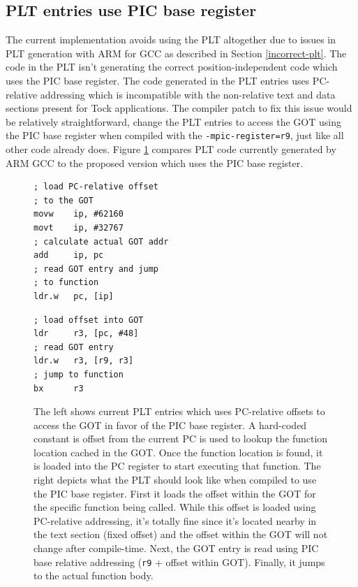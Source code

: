 \documentclass[12pt]{ucsddissertation}
\begin{document}
\subsection{PLT entries use PIC base register}

The current implementation avoids using the PLT altogether due to issues in PLT generation with ARM for GCC as described in Section \ref{incorrect-plt}. The code in the PLT isn't generating the correct position-independent code which uses the PIC base register. The code generated in the PLT entries uses PC-relative addressing which is incompatible with the non-relative text and data sections present for Tock applications. The compiler patch to fix this issue would be relatively straightforward, change the PLT entries to access the GOT using the PIC base register when compiled with the \texttt{-mpic-register=r9}, just like all other code already does. Figure \ref{fig:plt-fix} compares PLT code currently generated by ARM GCC to the proposed version which uses the PIC base register.

\begin{figure}[h!]
    \begin{minipage}{0.45\textwidth}
    \begin{verbatim}
; load PC-relative offset 
; to the GOT
movw    ip, #62160
movt    ip, #32767
; calculate actual GOT addr 
add     ip, pc
; read GOT entry and jump
; to function
ldr.w   pc, [ip]
    \end{verbatim}
    \end{minipage}
    \begin{minipage}{0.45\textwidth}
    \begin{verbatim}
; load offset into GOT
ldr     r3, [pc, #48]
; read GOT entry
ldr.w   r3, [r9, r3]
; jump to function
bx      r3
    \end{verbatim}
    \end{minipage}
    \caption[PLT Entries Using PIC Base Register]{The left shows current PLT entries which uses PC-relative offsets to access the GOT in favor of the PIC base register. A hard-coded constant is offset from the current PC is used to lookup the function location cached in the GOT. Once the function location is found, it is loaded into the PC register to start executing that function. The right depicts what the PLT should look like when compiled to use the PIC base register. First it loads the offset within the GOT for the specific function being called. While this offset is loaded using PC-relative addressing, it's totally fine since it's located nearby in the text section (fixed offset) and the offset within the GOT will not change after compile-time. Next, the GOT entry is read using PIC base relative addressing (\texttt{r9} + offset within GOT). Finally, it jumps to the actual function body.}
    \label{fig:plt-fix}
\end{figure}
\end{document}
